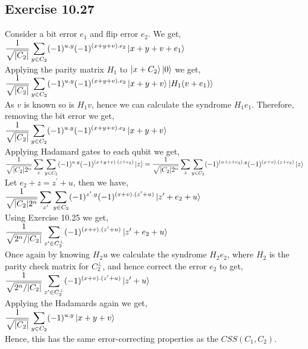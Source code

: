 \documentclass[a4paper,12pt]{article}
\begin{document}
\subsection*{Exercise 10.27}
Consider a bit error $e_1$ and flip error $e_2$. We get,\\
$\displaystyle\frac{1}{\sqrt{|C_2|}}\sum_{y\in C_2}(-1)^{u.y}
(-1)^{(x+y+v).e_2}\ket{x+y+v+e_1}$\\
Applying the parity matrix $H_1$ to $\ket{x+C_2}\ket{0}$ we get,\\
$\displaystyle\frac{1}{\sqrt{|C_2|}}\sum_{y\in C_2}(-1)^{u.y}
(-1)^{(x+y+v).e_2}\ket{x+y+v}\ket{H_1(v+e_1)}$\\
As $v$ is known so is $H_1v$, hence we can calculate the syndrome
$H_1e_1$. Therefore, removing the bit error we get,\\
$\displaystyle\frac{1}{\sqrt{|C_2|}}\sum_{y\in C_2}(-1)^{u.y}
(-1)^{(x+y+v).e_2}\ket{x+y+v}$\\
Applying Hadamard gates to each qubit we get,\\
$\displaystyle\frac{1}{\sqrt{|C_2|2^n}}\sum_z\sum_{y\in C_2}
(-1)^{u.y}(-1)^{(x+y+v).(z+e_2)}\ket{z}=
\frac{1}{\sqrt{|C_2|2^n}}\sum_z\sum_{y\in C_2}
(-1)^{(u+z+e_2).y}(-1)^{(x+v).(z+e_2)}\ket{z}$\\
Let $e_2+z=z^\prime+u$, then we have,\\
$\displaystyle\frac{1}{\sqrt{|C_2|2^n}}\sum_{z^\prime}\sum_{y\in C_2}
(-1)^{z^\prime.y}(-1)^{(x+v).(z^\prime +u)}\ket{z^\prime+e_2+u}$\\
Using Exercise 10.25 we get,\\
$\displaystyle\frac{1}{\sqrt{2^n/|C_2|}}\sum_{z^\prime\in C_2^\perp}
(-1)^{(x+v).(z^\prime +u)}\ket{z^\prime+e_2+u}$\\
Once again by knowing $H_2u$ we calculate the syndrome $H_2e_2$, where
$H_2$ is the parity check matrix for $C_2^\perp$, and hence correct the
error $e_2$ to get,\\
$\displaystyle\frac{1}{\sqrt{2^n/|C_2|}}\sum_{z^\prime\in C_2^\perp}
(-1)^{(x+v).(z^\prime +u)}\ket{z^\prime+u}$\\
Applying the Hadamards again we get,\\
$\displaystyle\frac{1}{\sqrt{|C_2|}}\sum_{y\in C_2}(-1)^{u.y}
\ket{x+y+v}$\\
Hence, this has the same error-correcting properties as the
$CSS(C_1,C_2)$.
\end{document}
